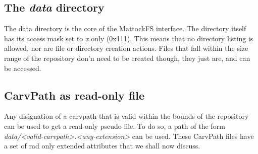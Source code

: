 \begin{itemize}
\begin{itemize}
\begin{itemize}
\begin{itemize}
\section{The \emph{data} directory}
The data directory is the core of the MattockFS interface. The directory itself has its access mask set to \emph{x} only (0x111). This means that no directory listing is allowed, nor are file or directory creation actions. Files that fall within the size range of the repository don'n need to be created though, they just are, and can be accessed.
\subsection{CarvPath as read-only file}
Any disignation of a carvpath that is valid within the bounds of the repository can be used to get a read-only pseudo file. To do so, a path of the form \emph{data/<valid-carvpath>.<any-extension>} can be used. These CarvPath files have a set of rad only extended attributes that we shall now discuss.

\end{itemize}
\end{itemize}
\end{itemize}
\end{itemize}
